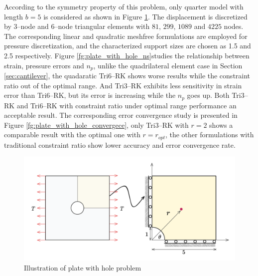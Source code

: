 According to the symmetry property of this problem, only quarter model with length $b=5$ is considered as shown in Figure \ref{fg:plate_with_hole_model}.
The displacement is discretized by 3--node and 6--node triangular elements with $81$, $299$, $1089$ and $4225$ nodes. 
The corresponding linear and quadratic meshfree formulations are employed for pressure discretization, and the characterized support sizes are chosen as 1.5 and 2.5 respectively.
Figure \ref{fg:plate_with_hole_ns}studies the relationship between strain, pressure errors and $n_p$,
unlike the quadrilateral element case in Section \ref{sec:cantilever},
the quadaratic Tri6--RK shows worse results while the constraint ratio out of the optimal range.
And Tri3--RK exhibits less sensitivity in strain error than Tri6--RK, but its error is increasing while the $n_p$ goes up.
Both Tri3--RK and Tri6--RK with constraint ratio under optimal range performance an acceptable result.
The corresponding error convergence study is presented in Figure \ref{fg:plate_with_hole_convergece},
only Tri3--RK with $r=2$ shows a comparable result with the optimal one with $r=r_{opt}$,
the other formulations with traditional constraint ratio show lower accuracy and error convergence rate.


\begin{figure}[H]
\centering
\includegraphics[width=\textwidth]{png/plate_with_hole_model.png}
\caption{Illustration of plate with hole problem}\label{fg:plate_with_hole_model}
\end{figure}


